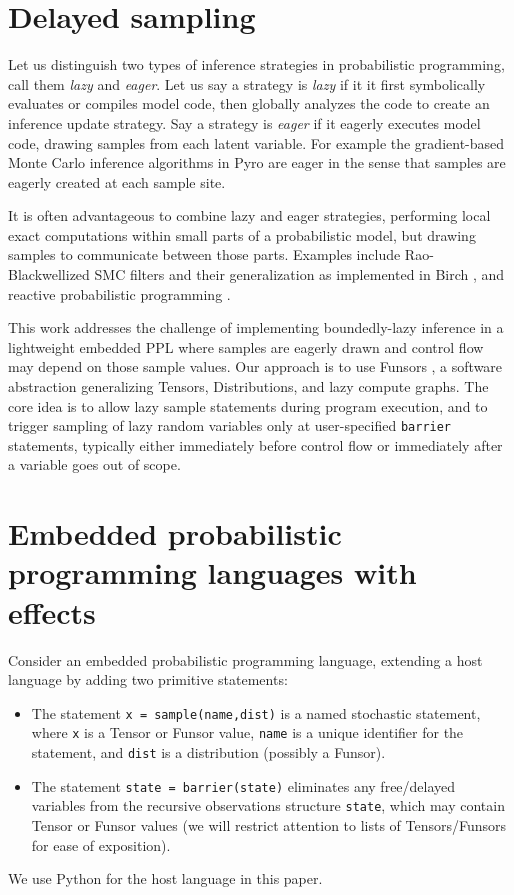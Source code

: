 \documentclass[anonymous=false, %
               format=acmsmall, %
               review=true, %
               screen=true, %
               nonacm=true]{acmart}
\begin{document}
\section{Delayed sampling}

Let us distinguish two types of inference strategies in probabilistic programming, call them \emph{lazy} and \emph{eager}.
Let us say a strategy is \emph{lazy} if it it first symbolically evaluates or compiles model code, then globally analyzes the code to create an inference update strategy.
Say a strategy is \emph{eager} if it eagerly executes model code, drawing samples from each latent variable.
For example the gradient-based Monte Carlo inference algorithms in Pyro are eager in the sense that samples are eagerly created at each sample site.

It is often advantageous to combine lazy and eager strategies, performing local exact computations within small parts of a probabilistic model, but drawing samples to communicate between those parts.
Examples include Rao-Blackwellized SMC filters and their generalization as implemented in Birch \cite{murray2017delayed}, and reactive probabilistic programming \cite{baudart2019reactive}.

This work addresses the challenge of implementing boundedly-lazy inference in a lightweight embedded PPL where samples are eagerly drawn and control flow may depend on those sample values.
Our approach is to use Funsors \cite{obermeyer2019functional}, a software abstraction generalizing Tensors, Distributions, and lazy compute graphs.
The core idea is to allow lazy sample statements during program execution, and to trigger sampling of lazy random variables only at user-specified \verb$barrier$ statements, typically either immediately before control flow or immediately after a variable goes out of scope.

\section{Embedded probabilistic programming languages with effects}

Consider an embedded probabilistic programming language, extending a host language by adding two primitive statements:
\begin{itemize}
  \item The statement \verb$x = sample(name,dist)$ is a named stochastic statement, where \verb$x$ is a Tensor or Funsor value, \verb$name$ is a unique identifier for the statement, and \verb$dist$ is a distribution (possibly a Funsor).
  \item The statement \verb$state = barrier(state)$ eliminates any free/delayed variables from the recursive observations structure \verb$state$, which may contain Tensor or Funsor values (we will restrict attention to lists of Tensors/Funsors for ease of exposition).
\end{itemize}
We use Python for the host language in this paper.
\end{document}
